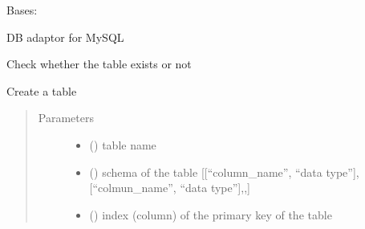 \documentclass[letterpaper,10pt,english]{sphinxmanual}
\begin{document}
\begin{fulllineitems}
\label{\detokenize{bbc1.core.data_handler:bbc1.core.data_handler.MysqlAdaptor}}
Bases: {\hyperref[\detokenize{bbc1.core.data_handler:bbc1.core.data_handler.DbAdaptor}]{}}

DB adaptor for MySQL

\begin{fulllineitems}
\label{\detokenize{bbc1.core.data_handler:bbc1.core.data_handler.MysqlAdaptor.check_table_existence}}
Check whether the table exists or not

\end{fulllineitems}


\begin{fulllineitems}
\label{\detokenize{bbc1.core.data_handler:bbc1.core.data_handler.MysqlAdaptor.create_table}}
Create a table
\begin{quote}\begin{description}
\item[{Parameters}] \leavevmode\begin{itemize}
\item {} 
 () \textendash{} table name

\item {} 
 () \textendash{} schema of the table {[}{[}“column\_name”, “data type”{]},{[}“colmun\_name”, “data type”{]},,{]}

\item {} 
 () \textendash{} index (column) of the primary key of the table


\end{itemize}
\end{description}
\end{quote}
\end{fulllineitems}
\end{fulllineitems}
\end{document}
